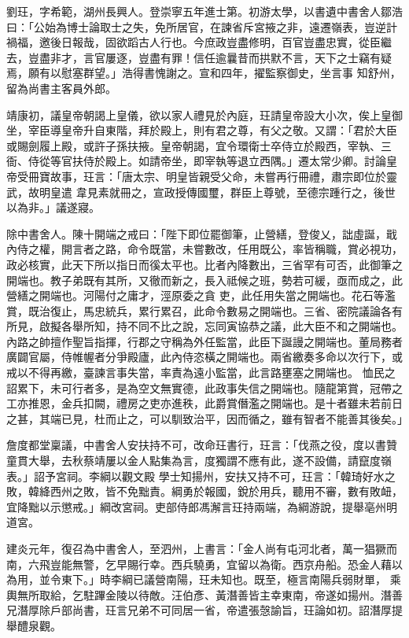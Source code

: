\begin{pinyinscope}
 劉玨，字希範，湖州長興人。登崇寧五年進士第。初游太學，以書遺中書舍人鄒浩曰：「公始為博士論取士之失，免所居官，在諫省斥宮掖之非，遠遷嶺表，豈逆計禍福，邀後日報哉，固欲蹈古人行也。今庶政豈盡修明，百官豈盡忠實，從臣繼去，豈盡非才，言官屢逐，豈盡有罪！信任逾曩昔而拱默不言，天下之士竊有疑焉，願有以慰塞群望。」浩得書愧謝之。宣和四年，擢監察御史，坐言事
 知舒州，留為尚書主客員外郎。



 靖康初，議皇帝朝謁上皇儀，欲以家人禮見於內庭，玨請皇帝設大小次，俟上皇御坐，宰臣導皇帝升自東階，拜於殿上，則有君之尊，有父之敬。又謂：「君於大臣或賜劍履上殿，或許子孫扶掖。皇帝朝謁，宜令環衛士卒侍立於殿西，宰執、三衙、侍從等官扶侍於殿上。如請帝坐，即宰執等退立西隅。」遷太常少卿。討論皇帝受冊寶故事，玨言：「唐太宗、明皇皆親受父命，未嘗再行冊禮，肅宗即位於靈武，故明皇遣
 韋見素就冊之，宣政授傳國璽，群臣上尊號，至德宗踵行之，後世以為非。」議遂寢。



 除中書舍人。陳十開端之戒曰：「陛下即位罷御筆，止營繕，登俊乂，詘虛誕，戢內侍之權，開言者之路，命令既當，未嘗數改，任用既公，率皆稱職，賞必視功，政必核實，此天下所以指日而徯太平也。比者內降數出，三省罕有可否，此御筆之開端也。教子弟既有其所，又徹而新之，長入祗候之班，勢若可緩，亟而成之，此營繕之開端也。河陽付之庸才，涇原委之貪
 吏，此任用失當之開端也。花石等濫賞，既治復止，馬忠統兵，累行累召，此命令數易之開端也。三省、密院議論各有所見，啟擬各舉所知，持不同不比之說，忘同寅協恭之議，此大臣不和之開端也。內路之帥擅作聖旨指揮，行郡之守稱為外任監當，此臣下誕謾之開端也。董局務者廣闢官屬，侍帷幄者分爭殿廬，此內侍恣橫之開端也。兩省繳奏多命以次行下，或戒以不得再繳，臺諫言事失當，率責為遠小監當，此言路壅塞之開端也。
 恤民之詔累下，未可行者多，是為空文無實德，此政事失信之開端也。隨龍第賞，冠帶之工亦推恩，金兵扣闕，禮房之吏亦進秩，此爵賞僭濫之開端也。是十者雖未若前日之甚，其端已見，杜而止之，可以馴致治平，因而循之，雖有智者不能善其後矣。」



 詹度都堂稟議，中書舍人安扶持不可，改命玨書行，玨言：「伐燕之役，度以書贊童貫大舉，去秋蔡靖屢以金人點集為言，度獨謂不應有此，遂不設備，請竄度嶺表。」詔予宮祠。李綱以觀文殿
 學士知揚州，安扶又持不可，玨言：「韓琦好水之敗，韓絳西州之敗，皆不免黜責。綱勇於報國，銳於用兵，聽用不審，數有敗衄，宜降黜以示懲戒。」綱改宮祠。吏部侍郎馮澥言玨持兩端，為綱游說，提舉亳州明道宮。



 建炎元年，復召為中書舍人，至泗州，上書言：「金人尚有屯河北者，萬一猖獗而南，六飛豈能無警，乞早賜行幸。西兵驍勇，宜留以為衛。西京舟船。恐金人藉以為用，並令東下。」時李綱已議營南陽，玨未知也。既至，極言南陽兵弱財單，
 乘輿無所取給，乞駐蹕金陵以待敵。汪伯彥、黃潛善皆主幸東南，帝遂如揚州。潛善兄潛厚除戶部尚書，玨言兄弟不可同居一省，帝遣張愨諭旨，玨論如初。詔潛厚提舉醴泉觀。




\end{pinyinscope}
